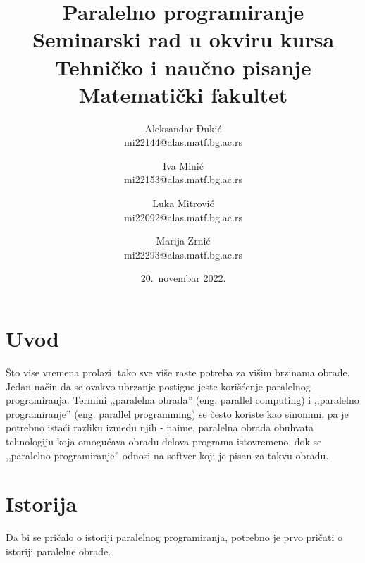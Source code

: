 \documentclass[a4paper]{article}
\begin{document}
	
	\title{Paralelno programiranje\\ \small{Seminarski rad u okviru kursa\\Tehničko i naučno pisanje\\ Matematički fakultet}}
	
	\author
	{
		Aleksandar Đukić\\mi22144@alas.matf.bg.ac.rs
		\and
		Iva Minić\\mi22153@alas.matf.bg.ac.rs
		\and
		Luka Mitrović\\mi22092@alas.matf.bg.ac.rs
		\and
		Marija Zrnić\\mi22293@alas.matf.bg.ac.rs
	}
	
	\date{20.~novembar 2022.}
	\maketitle
	
		\tableofcontents
		
	\newpage
	\section{Uvod}
	Što vise vremena prolazi, tako sve više raste potreba za višim brzinama obrade. Jedan način da se ovakvo ubrzanje postigne jeste korišćenje paralelnog programiranja. Termini ,,paralelna obrada'' (eng. parallel computing) i ,,paralelno programiranje'' (eng. parallel programming) se često koriste kao sinonimi, pa je potrebno istaći razliku između njih - naime, paralelna obrada obuhvata tehnologiju koja omogućava obradu delova programa istovremeno, dok se ,,paralelno programiranje'' odnosi na softver koji je pisan za takvu obradu.
	
	\section{Istorija}
	Da bi se pričalo o istoriji paralelnog programiranja, potrebno je prvo pričati o istoriji paralelne obrade.
\end{document}

